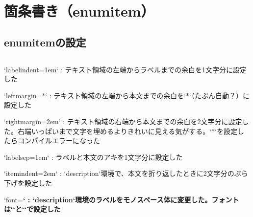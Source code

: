 \section{箇条書き（enumitem）}


\subsection{enumitemの設定}

\inputminted{latex}{./preamble/enumitem.tex}

\begin{markdown}
`labelindent=1em`
: テキスト領域の左端からラベルまでの余白を1文字分に設定した

`leftmargin=*`
: テキスト領域の左端から本文までの余白を`*`（たぶん自動？）に設定した

`rightmargin=2em`
: テキスト領域の右端から本文までの余白を2文字分に設定した。右端いっぱいまで文字を埋めるよりきれいに見える気がする。`*`を設定したらコンパイルエラーになった

`labelsep=1em`
: ラベルと本文のアキを1文字分に設定した

`itemindent=2em`
: `description`環境で、本文を折り返したときに2文字分のぶら下げを設定した

`font=\ttfamily\bfseries`
: `description`環境のラベルをモノスペース体に変更した。フォントは`\setmonofont{}`と`\setmonojfont{}`で設定した
\end{markdown}
